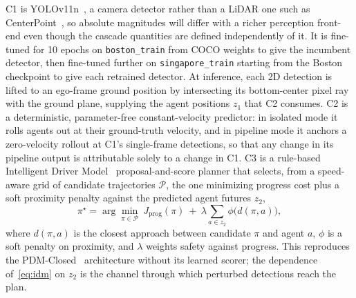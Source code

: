 \documentclass[conference]{IEEEtran}
\begin{document}
C1 is YOLOv11n~\cite{jocher2024yolo11}, a camera detector rather than a LiDAR
one such as CenterPoint~\cite{yin2021center}, so absolute magnitudes will differ
with a richer perception front-end even though the cascade quantities are
defined independently of it. It is fine-tuned for 10 epochs on
\texttt{boston\_train} from COCO weights to give the incumbent detector, then
fine-tuned further on \texttt{singapore\_train} starting from the Boston
checkpoint to give each retrained detector. At inference, each 2D detection is
lifted to an ego-frame ground position by intersecting its bottom-center pixel
ray with the ground plane, supplying the agent positions $z_1$ that C2
consumes. C2 is a deterministic, parameter-free constant-velocity predictor:
in isolated mode it rolls agents out at their ground-truth velocity, and in
pipeline mode it anchors a zero-velocity rollout at C1's single-frame
detections, so that any change in its pipeline output is attributable solely to
a change in C1.
C3 is a rule-based Intelligent Driver Model~\cite{treiber2000idm}
proposal-and-score planner that selects, from a speed-aware grid of candidate
trajectories $\mathcal{P}$, the one minimizing progress cost plus a soft
proximity penalty against the predicted agent futures $z_2$,
\begin{equation}
\pi^{\star} = \arg\min_{\pi \in \mathcal{P}}\
J_{\text{prog}}(\pi)
\ +\ \lambda \!\!\sum_{a \in z_2} \phi\bigl(d(\pi, a)\bigr),
\label{eq:idm}
\end{equation}
where $d(\pi,a)$ is the closest approach between candidate $\pi$ and agent $a$,
$\phi$ is a soft penalty on proximity, and $\lambda$ weights safety against
progress. This reproduces the PDM-Closed~\cite{dauner2023parting} architecture
without its learned scorer; the dependence of~\eqref{eq:idm} on $z_2$ is the
channel through which perturbed detections reach the plan.
\end{document}
